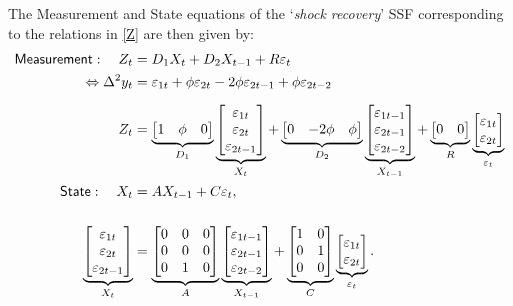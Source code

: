 \documentclass[a4paper,final,12pt]{article}
\newcommand{\bsq}{\begin{subequations}}\newcommand{\esq}{\end{subequations}}
\begin{document}
The Measurement and State equations of the `\emph{shock recovery}' SSF
corresponding to the relations in \ref{Z} are then given by:\bsq\label{K0SSM}%
\begin{align}
\mathsf{Measurement}:\quad Z_{t}& =D_{1}X_{t}+D_{2}X_{t-1}+R\varepsilon _{t}
\notag \\
\Leftrightarrow \Delta ^{2}y_{t}& =\varepsilon _{1t}+\phi \varepsilon
_{2t}-2\phi \varepsilon _{2t-1}+\phi \varepsilon _{2t-2} \\[2mm]
Z_{t}& =\underbrace{%
\begin{bmatrix}
1 & \phi  & 0%
\end{bmatrix}%
}_{D_{1}}\underbrace{%
\begin{bmatrix}
\varepsilon _{1t} \\ 
\varepsilon _{2t} \\ 
\varepsilon _{2t-1}%
\end{bmatrix}%
}_{X_{t}}+\underbrace{%
\begin{bmatrix}
0 & -2\phi  & \phi 
\end{bmatrix}%
}_{D_{2}}\underbrace{%
\begin{bmatrix}
\varepsilon _{1t-1} \\ 
\varepsilon _{2t-1} \\ 
\varepsilon _{2t-2}%
\end{bmatrix}%
}_{X_{t-1}}+\underbrace{%
\begin{bmatrix}
0 & 0%
\end{bmatrix}%
}_{R}\underbrace{%
\begin{bmatrix}
\varepsilon _{1t} \\ 
\varepsilon _{2t}%
\end{bmatrix}%
}_{\varepsilon _{t}} \\
\mathsf{State}:\quad X_{t}& =AX_{t-1}+C\varepsilon _{t},  \notag \\[5mm]
\underbrace{%
\begin{bmatrix}
\varepsilon _{1t} \\ 
\varepsilon _{2t} \\ 
\varepsilon _{2t-1}%
\end{bmatrix}%
}_{X_{t}}& =\underbrace{%
\begin{bmatrix}
0 & 0 & 0 \\ 
0 & 0 & 0 \\ 
0 & 1 & 0%
\end{bmatrix}%
}_{A}\underbrace{%
\begin{bmatrix}
\varepsilon _{1t-1} \\ 
\varepsilon _{2t-1} \\ 
\varepsilon _{2t-2}%
\end{bmatrix}%
}_{X_{t-1}}+\underbrace{%
\begin{bmatrix}
1 & 0 \\ 
0 & 1 \\ 
0 & 0%
\end{bmatrix}%
}_{C}\underbrace{%
\begin{bmatrix}
\varepsilon _{1t} \\ 
\varepsilon _{2t}%
\end{bmatrix}%
}_{\varepsilon _{t}}.
\end{align}%
\esq
\end{document}
